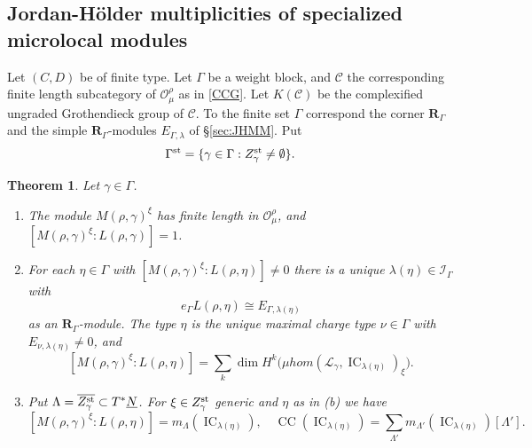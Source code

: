\documentclass[11pt,reqno]{amsart}
\newtheorem{Theorem}{Theorem}[section]
\theoremstyle{definition}
\theoremstyle{remark}
\def\dN{\underline N}
\def\scrO{\mathscr O}
\def\IC{\operatorname{IC}}
\def\muhom{\mu hom}
\def\bR{\mathbf R}
\begin{document}
\subsection{Jordan-H\"older multiplicities of specialized microlocal modules}
\label{subsec:microlocal-JH}
Let $(C,D)$ be of finite type. 
Let $\Gamma$ be a weight block, and $\mathscr C$ the corresponding finite length subcategory of
$\scrO_\mu^\rho$ as in \eqref{CCG}.
Let $K(\mathscr C)$ be the complexified ungraded Grothendieck group of $\mathscr C$.
To the finite set $\Gamma$ correspond the corner $\bR_\Gamma$ and the simple $\bR_\Gamma$-modules
$E_{\Gamma,\lambda}$ of \S\ref{sec:JHMM}.
Put
\begin{align}\label{GST}\Gamma^{\rm st}=\{\gamma\in\Gamma:Z_\gamma^{\rm st}\ne\emptyset\}.\end{align}

\begin{Theorem}\label{thm:microlocal-JH}Let $\gamma\in\Gamma$.\hfill
\begin{enumerate}[label=$\mathrm{(\alph*)}$,leftmargin=8mm]
\item\label{item:microlocal-JH-length}
The module $M(\rho,\gamma)^\xi$ has finite length in $\scrO_\mu^\rho$, and
$[M(\rho,\gamma)^\xi:L(\rho,\gamma)]=1$.

\item\label{item:microlocal-JH-global}
For each $\eta\in\Gamma$ with
$[M(\rho,\gamma)^\xi:L(\rho,\eta)]\ne0$ there is a
unique $\lambda(\eta)\in\mathcal I_\Gamma$ with
$$e_\Gamma L(\rho,\eta)\cong E_{\Gamma,\lambda(\eta)}$$ as an $\bR_\Gamma$-module.
The type $\eta$ is the unique maximal charge type
$\nu\in\Gamma$ with $E_{\nu,\lambda(\eta)}\ne0$, and
\begin{equation}\label{eq:microlocal-JH-global}
 [M(\rho,\gamma)^\xi:L(\rho,\eta)]
 =\sum_k\dim H^k\bigl(\muhom(\mathscr L_\gamma,
             \IC_{\lambda(\eta)})_\xi\bigr).
\end{equation}

\item\label{item:microlocal-JH-CC}
Put $\Lambda=\overline{Z_\gamma^{\rm st}}\subset T^*\dN$.
For $\xi\in Z_\gamma^{\rm st}$  generic and $\eta$ as in (b) we have
\begin{equation}\label{eq:microlocal-JH-CC}
 [M(\rho,\gamma)^\xi:L(\rho,\eta)]=m_\Lambda(\IC_{\lambda(\eta)}),
 \quad \operatorname{CC}(\IC_{\lambda(\eta)})
   =\sum_{\Lambda'}m_{\Lambda'}(\IC_{\lambda(\eta)})[\Lambda'].
\end{equation}
\end{enumerate}
\end{Theorem}
\end{document}
